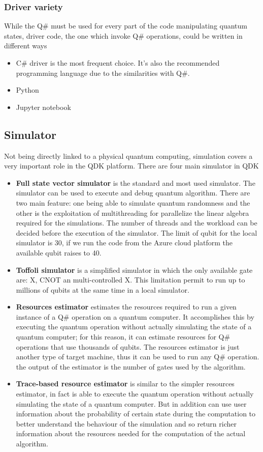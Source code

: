 \documentclass[main.tex]{subfiles}
\begin{document}
	\subsubsection{Driver variety}
	While the Q\# must be used for every part of the code manipulating quantum states, driver code, the one which invoke Q\# operations, could be written in different ways
	\begin{itemize}
	\item C\# driver is the most frequent choice. It's also the recommended programming language due to the similarities with Q\#.
	\item Python
	\item Jupyter notebook
	\end{itemize}
	
	\subsection{Simulator}
	Not being directly linked to a physical quantum computing, simulation covers a very important role in the QDK platform.
	There are four main simulator in QDK
	\begin{itemize}
	\item \textbf{Full state vector simulator} is the standard and most used simulator. The simulator can be used to execute and debug quantum algorithm.
	There are two main feature: one being able to simulate quantum randomness and the other is the exploitation of multithreading for parallelize the linear algebra required for the simulations. The number of threads and the workload can be decided before the execution of the simulator. The limit of qubit for the local simulator is 30, if we run the code from the Azure cloud platform the available qubit raises to 40.
	\item \textbf{Toffoli simulator} is a simplified simulator in which	the only available gate are: X, CNOT an multi-controlled X. This limitation permit to run up to millions of qubits at the same time in a local simulator.
	\item \textbf{Resources estimator} estimates the resources required to run a given instance of a Q\# operation on a quantum computer. It accomplishes this by executing the quantum operation without actually simulating the state of a quantum computer; for this reason, it can estimate resources for Q\# operations that use thousands of qubits. The resources estimator is just another type of target machine, thus it can be used to run any Q\# operation. the output of the estimator is the number of gates used by the algorithm.
	\item \textbf{Trace-based resource estimator} is similar to the simpler resources estimator, in fact is able to execute the quantum operation without actually simulating the state of a quantum computer. But in addition can use user information about the probability of certain state during the computation to better understand the behaviour of the simulation and so return richer information about the resources needed for the computation of the actual algorithm.
	\end{itemize}
	
\end{document}

